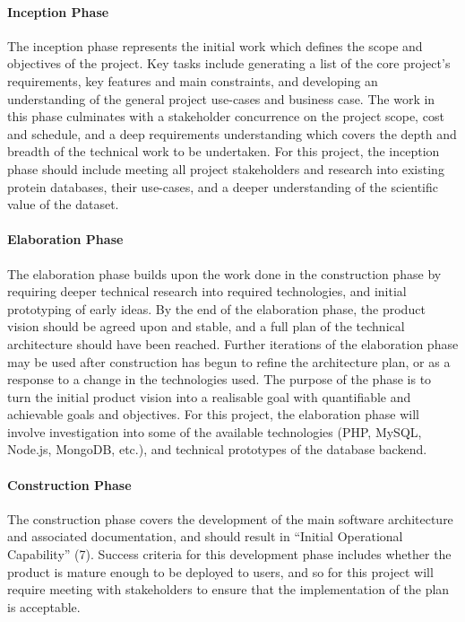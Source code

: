 \documentclass[12pt,a4paper]{article}
\begin{document}
\paragraph{Inception Phase} The inception phase represents the initial work
which defines the scope and objectives of the project. Key tasks include
generating a list of the core project’s requirements, key features and main
constraints, and developing an understanding of the general project use-cases
and business case. The work in this phase culminates with a stakeholder
concurrence on the project scope, cost and schedule, and a deep requirements
understanding which covers the depth and breadth of the technical work to be
undertaken. For this project, the inception phase should include meeting all
project stakeholders and research into existing protein databases, their
use-cases, and a deeper understanding of the scientific value of the dataset.

\paragraph{Elaboration Phase} The elaboration phase builds upon the work done in
the construction phase by requiring deeper technical research into required
technologies, and initial prototyping of early ideas. By the end of the
elaboration phase, the product vision should be agreed upon and stable, and a
full plan of the technical architecture should have been reached.  Further
iterations of the elaboration phase may be used after construction has begun to
refine the architecture plan, or as a response to a change in the technologies
used. The purpose of the phase is to turn the initial product vision into a
realisable goal with quantifiable and achievable goals and objectives. For this
project, the elaboration phase will involve investigation into some of the
available technologies (PHP, MySQL, Node.js, MongoDB, etc.), and technical
prototypes of the database backend.

\paragraph{Construction Phase} The construction phase covers the development of
the main software architecture and associated documentation, and should result
in ``Initial Operational Capability'' (7). Success criteria for this development
phase includes whether the product is mature enough to be deployed to users, and
so for this project will require meeting with stakeholders to ensure that the
implementation of the plan is acceptable.
\end{document}
